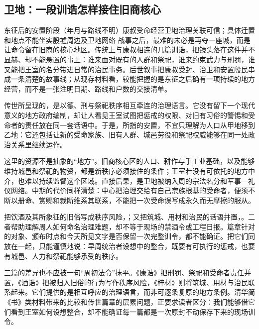 \subsection{卫地：一段训诰怎样接住旧商核心}

\begin{event}{东征后的安置阶段（年月与路线不明）}{康叔受命经营卫地}{治理关联可信；具体迁置和地点不能坐实}{殷墟周边及卫地网络}
战事之后，最难的未必是再夺一座城，而是让命令留在旧商的核心地区。传统上与康叔相连的几篇训诰，把镜头落在这件并不显赫、却不能悬置的事上：谁来面对既有的人群和祭祀，谁来约束武力与刑罚，谁又能把王室的名分带进日常的治民事务。后世叙事把康叔受封、治卫和安置殷民串成一条清楚的故事线；从现存材料看，较能把握的是东征之后确有一项持续的地方经营，而不是一张注明日期、路线和户数的交接清单。

传世所呈现的，是以德、刑与祭祀秩序相互牵连的治理语言。它没有留下一个现代意义的地方政府编制，却让人看见王室试图把惩戒的权限、对旧有习俗的警惕和受命者的责任放在同一套话语中。于是，所指的安置，不宜只理解为人口从甲地移到乙地：它还包括让新的受命家族、旧有人群、城邑劳役和祭祀权威能够在同一处政治关系里继续运作。

这里的资源不是抽象的“地方”。旧商核心区的人口、耕作与手工业基础，以及能够维持城邑和祭祀的物资，都是新秩序必须接住的条件；王室若没有可依托的地方中介，也难以持续监督这个区域。直接后果，是卫地被纳入周的宗法名分和军事—礼仪网络。中期的代价同样清楚：中心把治理交给有自己宗族根基的受命者，便须不断以册命、赏赐和裁断维系其联系，不能把一次受命误写成永久而无摩擦的服从。
\end{event}

把饮酒及其所象征的旧俗写成秩序风险，；又把筑城、用材和治民的话语并置，。二者帮助理解周人如何命名治理难题，却不等于现场的禁酒令或工程日报。篇章针对的对象、颁布时点和今天所见文字是否保留一次完整训令，都不能确证。把它们同放在一起，只能谨慎地说：早周统治者设想中的整合，既要有可执行的惩戒，也要有城邑、人力和祭祀能够承受的秩序。

三篇的差异也不应被一句“周初法令”抹平。《康诰》把刑罚、祭祀和受命者责任并置，《酒诰》把被归入旧俗的行为写作秩序风险，《梓材》则将筑城、用材与治民联系起来。它们提供的是相互呼应的治理语言，而非可逐条复原的地方条例。清华简《书》类材料带来的比较和传世篇章的层累问题，正要求读者区分：我们能够借它们看到王室如何设想整合，却不能确证每一篇都是一次原封不动保存下来的现场训令。

